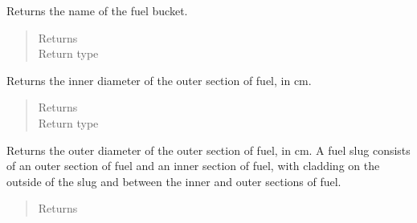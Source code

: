 \documentclass[letterpaper,10pt,openany,oneside,english]{sphinxmanual}
\begin{document}
\begin{fulllineitems}
\begin{fulllineitems}
\label{\detokenize{support_rst/fuel_bucket:fuel_bucket.FuelBucket.name}}
Returns the name of the fuel bucket.
\begin{quote}\begin{description}
\item[{Returns}] \leavevmode
{}

\item[{Return type}] \leavevmode
{}

\end{description}\end{quote}

\end{fulllineitems}


\begin{fulllineitems}
\label{\detokenize{support_rst/fuel_bucket:fuel_bucket.FuelBucket.outer_slug_id}}
Returns the inner diameter of the outer section of fuel, in cm.
\begin{quote}\begin{description}
\item[{Returns}] \leavevmode
{}

\item[{Return type}] \leavevmode
{}

\end{description}\end{quote}

\end{fulllineitems}


\begin{fulllineitems}
\label{\detokenize{support_rst/fuel_bucket:fuel_bucket.FuelBucket.outer_slug_od}}
Returns the outer diameter of the outer section of fuel, in cm. A fuel
slug consists of an outer section of fuel and an inner section of fuel,
with cladding on the outside of the slug and between the inner and
outer sections of fuel.
\begin{quote}\begin{description}
\item[{Returns}] \leavevmode
{}


\end{description}
\end{quote}
\end{fulllineitems}
\end{fulllineitems}
\end{document}

